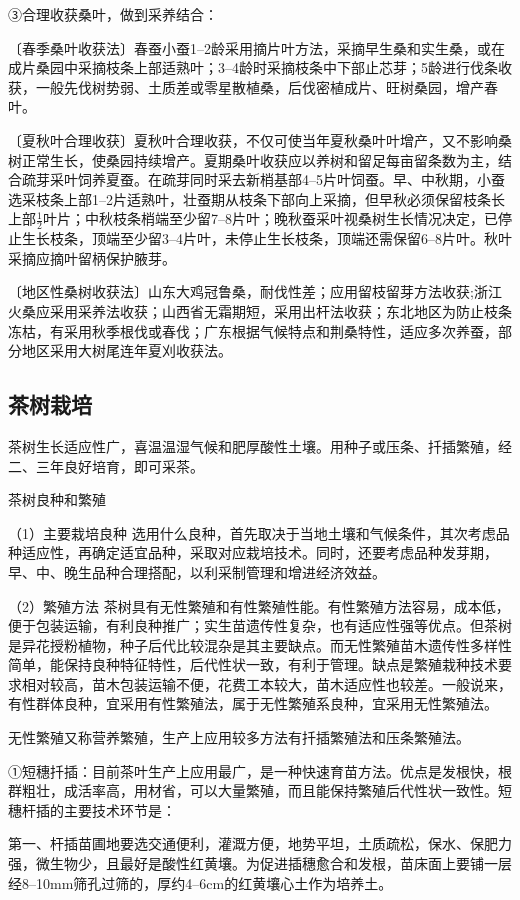 \documentclass{ctexbook}
\begin{document}
③合理收获桑叶，做到采养结合：

〔春季桑叶收获法〕春蚕小蚕1--2龄采用摘片叶方法，采摘早生桑和实生桑，或在成片桑园中采摘枝条上部适熟叶；3--4龄时采摘枝条中下部止芯芽；5龄进行伐条收获，一般先伐树势弱、土质差或零星散植桑，后伐密植成片、旺树桑园，增产春叶。

〔夏秋叶合理收获〕夏秋叶合理收获，不仅可使当年夏秋桑叶叶增产，又不影响桑树正常生长，使桑园持续增产。夏期桑叶收获应以养树和留足每亩留条数为主，结合疏芽采叶饲养夏蚕。在疏芽同时采去新梢基部4--5片叶饲蚕。早、中秋期，小蚕选采枝条上部1--2片适熟叶，壮蚕期从枝条下部向上采摘，但早秋必须保留枝条长上部$\frac{1}{2}$叶片；中秋枝条梢端至少留7--8片叶；晚秋蚕采叶视桑树生长情况决定，已停止生长枝条，顶端至少留3--4片叶，未停止生长枝条，顶端还需保留6--8片叶。秋叶采摘应摘叶留柄保护腋芽。

〔地区性桑树收获法〕山东大鸡冠鲁桑，耐伐性差；应用留枝留芽方法收获;浙江火桑应采用采养法收获；山西省无霜期短，采用出杆法收获；东北地区为防止枝条冻枯，有采用秋季根伐或春伐；广东根据气候特点和荆桑特性，适应多次养蚕，部分地区采用大树尾连年夏刈收获法。
\subsection{茶树栽培}
茶树生长适应性广，喜温温湿气候和肥厚酸性土壤。用种子或压条、扦插繁殖，经二、三年良好培育，即可采茶。

茶树良种和繁殖

（1）主要栽培良种 选用什么良种，首先取决于当地土壤和气候条件，其次考虑品种适应性，再确定适宜品种，采取对应栽培技术。同时，还要考虑品种发芽期，早、中、晚生品种合理搭配，以利采制管理和增进经济效益。

（2）繁殖方法 茶树具有无性繁殖和有性繁殖性能。有性繁殖方法容易，成本低，便于包装运输，有利良种推广；实生苗遗传性复杂，也有适应性强等优点。但茶树是异花授粉植物，种子后代比较混杂是其主要缺点。而无性繁殖苗木遗传性多样性简单，能保持良种特征特性，后代性状一致，有利于管理。缺点是繁殖栽种技术要求相对较高，苗木包装运输不便，花费工本较大，苗木适应性也较差。一般说来，有性群体良种，宜采用有性繁殖法，属于无性繁殖系良种，宜采用无性繁殖法。

无性繁殖又称营养繁殖，生产上应用较多方法有扦插繁殖法和压条繁殖法。

①短穗扦插：目前茶叶生产上应用最广，是一种快速育苗方法。优点是发根快，根群粗壮，成活率高，用材省，可以大量繁殖，而且能保持繁殖后代性状一致性。短穗杆插的主要技术环节是：

第一、杆插苗圃地要选交通便利，灌溉方便，地势平坦，土质疏松，保水、保肥力强，微生物少，且最好是酸性红黄壤。为促进插穗愈合和发根，苗床面上要铺一层经8--10mm筛孔过筛的，厚约4--6cm的红黄壤心土作为培养土。
\end{document}
